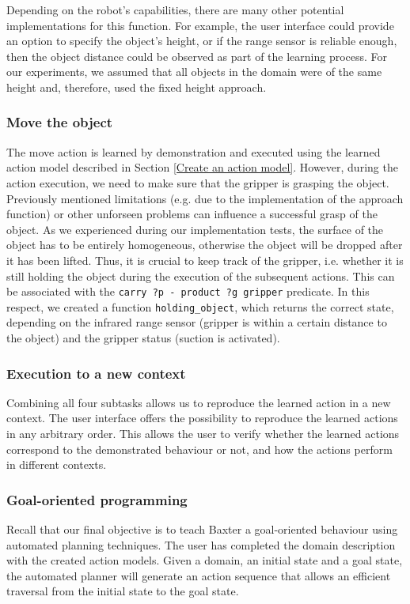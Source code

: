 Depending on the robot's capabilities, there are many other potential implementations for this function.
For example, the user interface could provide an option to specify the object's height, or if the range sensor is reliable enough, then the object distance could be observed as part of the learning process.
For our experiments, we assumed that all objects in the domain were of the same height and, therefore, used the fixed height approach.


\subsubsection{Move the object}\label{holdingObject}
The move action is learned by demonstration and executed using the learned action model described in Section \ref{Create an action model}.
However, during the action execution, we need to make sure that the gripper is grasping the object.
Previously mentioned limitations (e.g.
due to the implementation of the approach function) or other unforseen problems can influence a successful grasp of the object.
As we experienced during our implementation tests, the surface of the object has to be entirely homogeneous, otherwise the object will be dropped after it has been lifted.
Thus, it is crucial to keep track of the gripper, i.e.
whether it is still holding the object during the execution of the subsequent actions.
This can be associated with the \texttt{carry ?p - product ?g gripper} predicate.
In this respect, we created a function \texttt{holding_object}, which returns the correct state, depending on the infrared range sensor (gripper is within a certain distance to the object) and the gripper status (suction is activated).

\subsubsection{Execution to a new context}
Combining all four subtasks allows us to reproduce the learned action in a new context.
The user interface offers the possibility to reproduce the learned actions in any arbitrary order.
This allows the user to verify whether the learned actions correspond to the demonstrated behaviour or not, and how the actions perform in different contexts.

\subsubsection{Goal-oriented programming}
Recall that our final objective is to teach Baxter a goal-oriented behaviour using automated planning techniques.
The user has completed the domain description with the created action models.
Given a domain, an initial state and a goal state, the automated planner will generate an action sequence that allows an efficient traversal from the initial state to the goal state.

